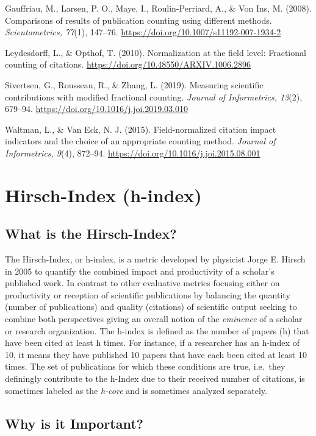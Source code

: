 \documentclass[
  letterpaper,
]{scrreprt}
\begin{document}
Gauffriau, M., Larsen, P. O., Maye, I., Roulin-Perriard, A., \& Von Ins,
M. (2008). Comparisons of results of publication counting using
different methods. \emph{Scientometrics, 77}(1), 147--76.
\url{https://doi.org/10.1007/s11192-007-1934-2}

Leydesdorff, L., \& Opthof, T. (2010). Normalization at the field level:
Fractional counting of citations.
\url{https://doi.org/10.48550/ARXIV.1006.2896}

Sivertsen, G., Rousseau, R., \& Zhang, L. (2019). Measuring scientific
contributions with modified fractional counting. \emph{Journal of
Informetrics, 13}(2), 679--94.
\url{https://doi.org/10.1016/j.joi.2019.03.010}

Waltman, L., \& Van Eck, N. J. (2015). Field-normalized citation impact
indicators and the choice of an appropriate counting method.
\emph{Journal of Informetrics, 9}(4), 872--94.
\url{https://doi.org/10.1016/j.joi.2015.08.001}

\chapter{Hirsch-Index (h-index)}\label{hirsch-index-h-index}

\section{What is the Hirsch-Index?}\label{what-is-the-hirsch-index}

The Hirsch-Index, or h-index, is a metric developed by physicist Jorge
E. Hirsch in 2005 to quantify the combined impact and productivity of a
scholar's published work. In contrast to other evaluative metrics
focusing either on productivity or reception of scientific publications
by balancing the quantity (number of publications) and quality
(citations) of scientific output seeking to combine both perspectives
giving an overall notion of the \emph{eminence} of a scholar or research
organization. The h-index is defined as the number of papers (h) that
have been cited at least h times. For instance, if a researcher has an
h-index of 10, it means they have published 10 papers that have each
been cited at least 10 times. The set of publications for which these
conditions are true, i.e.~they definingly contribute to the h-Index due
to their received number of citations, is sometimes labeled as the
\emph{h-core} and is sometimes analyzed separately.

\section{Why is it Important?}\label{why-is-it-important-7}
\end{document}
